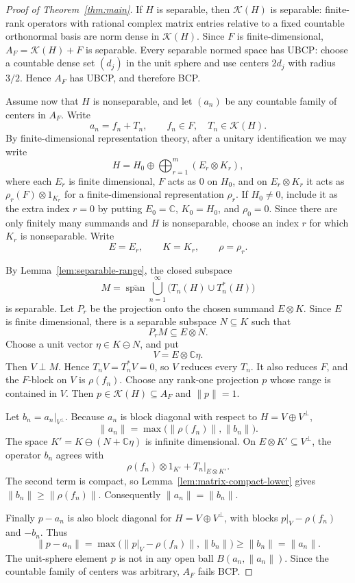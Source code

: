 \documentclass[11pt]{article}
\newcommand{\Kcal}{\mathcal K}
\begin{document}
\begin{proof}[Proof of Theorem~\ref{thm:main}]
If \(H\) is separable, then \(\Kcal(H)\) is separable: finite-rank operators
with rational complex matrix entries relative to a fixed countable
orthonormal basis are norm dense in \(\Kcal(H)\).  Since \(F\) is
finite-dimensional, \(A_F=\Kcal(H)+F\) is separable.  Every separable normed
space has UBCP: choose a countable dense set \((d_j)\) in the unit sphere and
use centers \(2d_j\) with radius \(3/2\).  Hence \(A_F\) has UBCP, and
therefore BCP.

Assume now that \(H\) is nonseparable, and let \((a_n)\) be any countable
family of centers in \(A_F\).  Write
\[
        a_n=f_n+T_n,\qquad f_n\in F,\quad T_n\in\Kcal(H).
\]
By finite-dimensional representation theory, after a unitary identification
we may write
\[
        H=H_0\oplus\bigoplus_{r=1}^m (E_r\otimes K_r),
\]
where each \(E_r\) is finite dimensional, \(F\) acts as \(0\) on \(H_0\), and
on \(E_r\otimes K_r\) it acts as \(\rho_r(F)\otimes1_{K_r}\) for a
finite-dimensional representation \(\rho_r\).  If \(H_0\ne0\), include it as
the extra index \(r=0\) by putting \(E_0=\mathbb C\), \(K_0=H_0\), and
\(\rho_0=0\).  Since there are only finitely many summands and \(H\) is
nonseparable, choose an index \(r\) for which \(K_r\) is nonseparable.  Write
\[
        E=E_r,\qquad K=K_r,\qquad \rho=\rho_r.
\]

By Lemma~\ref{lem:separable-range}, the closed subspace
\[
        M=\overline{\operatorname{span}}\bigcup_{n=1}^\infty
        \bigl(T_n(H)\cup T_n^*(H)\bigr)
\]
is separable.  Let \(P_r\) be the projection onto the chosen summand
\(E\otimes K\).  Since \(E\) is finite dimensional, there is a separable
subspace \(N\subseteq K\) such that
\[
        P_rM\subseteq E\otimes N.
\]
Choose a unit vector \(\eta\in K\ominus N\), and put
\[
        V=E\otimes\mathbb C\eta.
\]
Then \(V\perp M\).  Hence \(T_nV=T_n^*V=0\), so \(V\) reduces every \(T_n\).
It also reduces \(F\), and the \(F\)-block on \(V\) is \(\rho(f_n)\).
Choose any rank-one projection \(p\) whose range is contained in \(V\).  Then
\(p\in\Kcal(H)\subseteq A_F\) and \(\|p\|=1\).

Let \(b_n=a_n|_{V^\perp}\).  Because \(a_n\) is block diagonal with respect to
\(H=V\oplus V^\perp\),
\[
        \|a_n\|=\max\bigl(\|\rho(f_n)\|,\|b_n\|\bigr).
\]
The space \(K'=K\ominus(N+\mathbb C\eta)\) is infinite dimensional.  On
\(E\otimes K'\subseteq V^\perp\), the operator \(b_n\) agrees with
\[
        \rho(f_n)\otimes1_{K'}+T_n|_{E\otimes K'}.
\]
The second term is compact, so Lemma~\ref{lem:matrix-compact-lower} gives
\(\|b_n\|\ge\|\rho(f_n)\|\).  Consequently \(\|a_n\|=\|b_n\|\).

Finally \(p-a_n\) is also block diagonal for \(H=V\oplus V^\perp\), with
blocks \(p|_V-\rho(f_n)\) and \(-b_n\).  Thus
\[
        \|p-a_n\|
        =
        \max\bigl(\|p|_V-\rho(f_n)\|,\|b_n\|\bigr)
        \ge \|b_n\|
        =
        \|a_n\|.
\]
The unit-sphere element \(p\) is not in any open ball
\(B(a_n,\|a_n\|)\).  Since the countable family of centers was arbitrary,
\(A_F\) fails BCP.
\end{proof}
\end{document}

